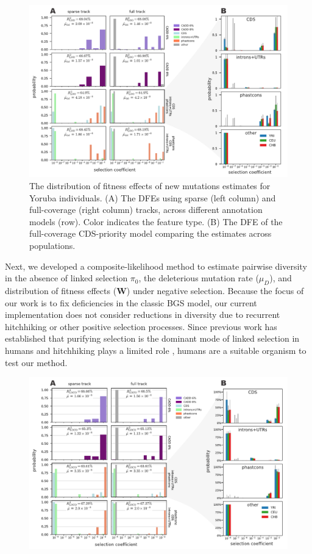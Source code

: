 \documentclass[11pt]{article}
\begin{document}
\begin{figure}[htbp] \centering
    \includegraphics[width=\textwidth]{figures/figure_3.pdf} 
    \caption{The distribution of fitness effects of new mutations estimates for
        Yoruba individuals. (A) The DFEs using sparse (left column) and
        full-coverage (right column) tracks, across different annotation models
        (row). Color indicates the feature type. (B) The DFE of the
        full-coverage CDS-priority model comparing the estimates across
    populations.}
  \label{fig:figure-3}
\end{figure}



Next, we developed a composite-likelihood method to estimate pairwise diversity
in the absence of linked selection $\pi_0$, the deleterious mutation rate
($\mu_D$), and distribution of fitness effects ($\mathbf{W}$) under negative
selection. Because the focus of our work is to fix deficiencies in the classic
BGS model, our current implementation does not consider reductions in diversity
due to recurrent hitchhiking or other positive selection processes. Since
previous work has established that purifying selection is the dominant mode of
linked selection in humans and hitchhiking plays a limited role
\parencite{McVicker2009-ax,Murphy2022-sj}, humans are a suitable organism to
test our method. 

\begin{figure}[htbp] 
    \centering
    \includegraphics[width=\textwidth]{figures/figure_4.pdf} 
    \caption{}
  \label{fig:figure-4}
\end{figure}
\end{document}

